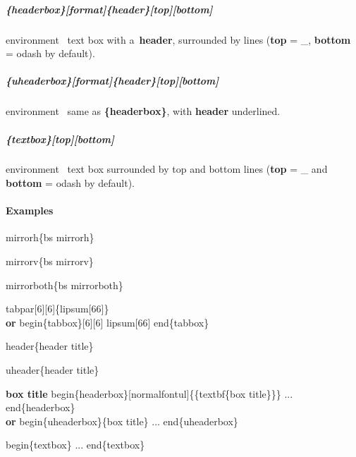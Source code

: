\documentclass[english,12pt,openany,letterpaper]{book}
\begin{document}
\subparagraph{\{headerbox\}[format]\{header\}[top][bottom]} environment \dash\ text box with a~\textbf{header}, surrounded by lines (\textbf{top} = \bs\_, \textbf{bottom} = \bs odash by default).

\subparagraph{\{uheaderbox\}[format]\{header\}[top][bottom]} environment \dash\ same as \textbf{\{headerbox\}}, with \textbf{header} underlined.

\skipline

\subparagraph{\{textbox\}[top][bottom]} environment \dash\ text box surrounded by top and bottom lines (\textbf{top} = \bs\_ and \textbf{bottom} = \bs odash by default).

\break

\paragraph{Examples}


 \tab \bs mirrorh\{\bs bs mirrorh\}

 \tab \bs mirrorv\{\bs bs mirrorv\}

 \bs mirrorboth\{\bs bs mirrorboth\}

\skipline

\bs tabpar[6][6]\{\bs lipsum[66]\}
\\\textbf{or} \bs begin\{tabbox\}[6][6] \bs lipsum[66] \bs end\{tabbox\}

\tabpar[6][6]{\lipsum[66]}

\skipline


\bs header\{header title\}

\skipline


\bs uheader\{header title\}

\skipline

\begin{uheaderbox}{\textbf{box title}}
	\bs begin\{headerbox\}[\bs normalfont\bs ul]\{\{\bs textbf\{box title\}\}\} ... \bs end\{headerbox\}
	\\\textbf{or}
	\bs begin\{uheaderbox\}\{box title\} ... \bs end\{uheaderbox\}
\end{uheaderbox}

\begin{textbox}
	\bs begin\{textbox\} ... \bs end\{textbox\}
\end{textbox}
\end{document}
